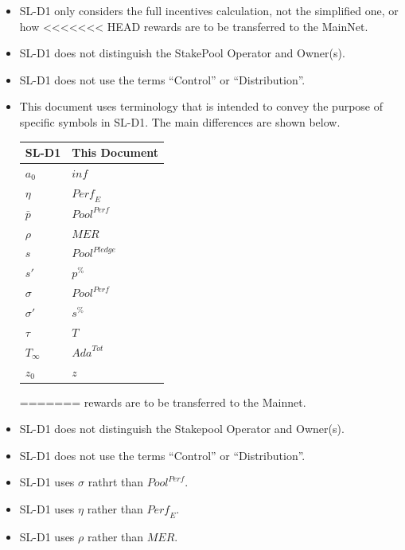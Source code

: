 \documentclass[11pt,a4paper,dvipsnames,twosided,final]{article}
\begin{document}
\begin{itemize}
\item
  SL-D1 only considers the full incentives calculation, not the simplified one, or how
<<<<<<< HEAD
  rewards are to be transferred to the MainNet.
\item
  SL-D1 does not distinguish the StakePool Operator and Owner(s).
\item
  SL-D1 does not use the terms ``Control'' or ``Distribution''.
\item
  This document uses terminology that is intended to convey the purpose of specific symbols
  in SL-D1.  The main differences are shown below.

  \begin{center}
  \begin{tabular}{||l|l||}\hline\hline
    \textbf{SL-D1} & \textbf{This Document} \\ \hline
  $a_0$ & $\textit{inf}$ \\ \hline
  $\eta$ & $\textit{Perf}_E$ \\ \hline
  $\bar{p}$  & $\textit{Pool}^{\textit{Perf}}$ \\ \hline
  $\rho$ & $\textit{MER}$ \\ \hline
  $s$  & $\textit{Pool}^{\textit{Pledge}}$ \\ \hline
  $s'$  & $\textit{p}^{\%}$ \\ \hline
  $\sigma$ & $\textit{Pool}^{\textit{Perf}}$ \\
  $\sigma'$  & $\textit{s}^{\%}$ \\ \hline
  $\tau$  & $T$ \\ \hline
  $T_{\infty}$  & $\textit{Ada}^{Tot}$ \\ \hline
  $z_0$ & $z$ \\ \hline
\hline
\end{tabular}
\end{center}
=======
  rewards are to be transferred to the Mainnet.
\item
  SL-D1 does not distinguish the Stakepool Operator and Owner(s).
\item
  SL-D1 does not use the terms ``Control'' or ``Distribution''.
\item
  SL-D1 uses $\sigma$ rathrt than $\textit{Pool}^{\textit{Perf}}$.
\item
  SL-D1 uses $\eta$ rather than $\textit{Perf}_E$.
\item
  SL-D1 uses $\rho$ rather than $\textit{MER}$.

\end{itemize}
\end{document}
